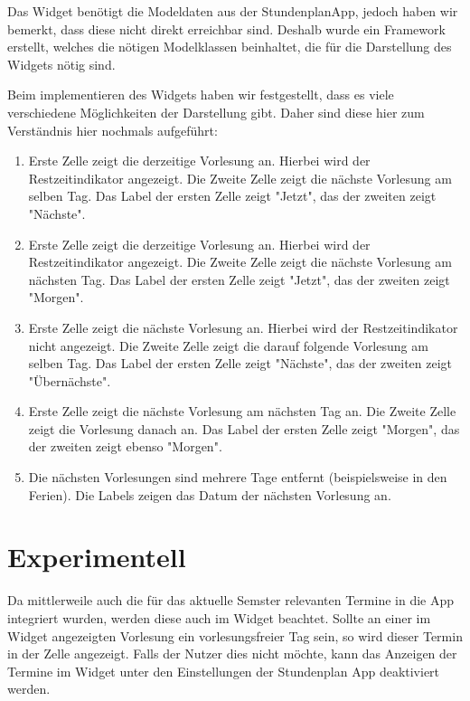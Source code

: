 Das Widget benötigt die Modeldaten aus der StundenplanApp, jedoch haben wir bemerkt, dass diese nicht direkt erreichbar sind. Deshalb wurde ein Framework erstellt, welches die nötigen Modelklassen beinhaltet, die für die Darstellung des Widgets nötig sind.

Beim implementieren des Widgets haben wir festgestellt, dass es viele verschiedene Möglichkeiten der Darstellung gibt. Daher sind diese hier zum Verständnis hier nochmals aufgeführt:

\begin{enumerate}
\item Erste Zelle zeigt die derzeitige Vorlesung an. Hierbei wird der Restzeitindikator angezeigt. Die Zweite Zelle zeigt die nächste Vorlesung am selben Tag. Das Label der ersten Zelle zeigt "Jetzt", das der zweiten zeigt "Nächste".
\item Erste Zelle zeigt die derzeitige Vorlesung an. Hierbei wird der Restzeitindikator angezeigt. Die Zweite Zelle zeigt die nächste Vorlesung am nächsten Tag. Das Label der ersten Zelle zeigt "Jetzt", das der zweiten zeigt "Morgen".
\item Erste Zelle zeigt die nächste Vorlesung an. Hierbei wird der Restzeitindikator nicht angezeigt. Die Zweite Zelle zeigt die darauf folgende Vorlesung am selben Tag. Das Label der ersten Zelle zeigt "Nächste", das der zweiten zeigt "Übernächste".
\item Erste Zelle zeigt die nächste Vorlesung am nächsten Tag an. Die Zweite Zelle zeigt die Vorlesung danach an. Das Label der ersten Zelle zeigt "Morgen", das der zweiten zeigt ebenso "Morgen".
\item Die nächsten Vorlesungen sind mehrere Tage entfernt (beispielsweise in den Ferien). Die Labels zeigen das Datum der nächsten Vorlesung an.
\end{enumerate}

\section{Experimentell}

Da mittlerweile auch die für das aktuelle Semster relevanten Termine in die App integriert wurden, werden diese auch im Widget beachtet. Sollte an einer im Widget angezeigten Vorlesung ein vorlesungsfreier Tag sein, so wird dieser Termin in der Zelle angezeigt. Falls der Nutzer dies nicht möchte, kann das Anzeigen der Termine im Widget unter den Einstellungen der Stundenplan App deaktiviert werden. 
